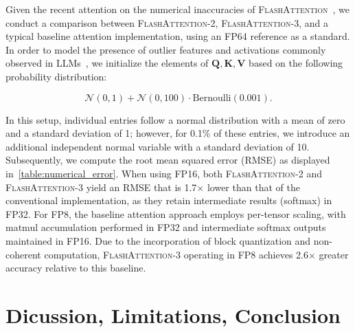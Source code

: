 Given the recent attention on the numerical inaccuracies of \textsc{FlashAttention}~\citep{golden2024flash}, we conduct a comparison between \textsc{FlashAttention-2}, \textsc{FlashAttention-3}, and a typical baseline attention implementation, using an FP64 reference as a standard. In order to model the presence of outlier features and activations commonly observed in LLMs~\citep{dettmers2208llm, sun2024massive}, we initialize the elements of $\mathbf{Q}, \mathbf{K}, \mathbf{V}$ based on the following probability distribution:

\begin{equation*}
  \mathcal{N}(0, 1) + \mathcal{N}(0, 100) \cdot \mathrm{Bernoulli}(0.001).
\end{equation*}

In this setup, individual entries follow a normal distribution with a mean of zero and a standard deviation of 1; however, for 0.1\% of these entries, we introduce an additional independent normal variable with a standard deviation of 10. Subsequently, we compute the root mean squared error (RMSE) as displayed in~\cref{table:numerical_error}. When using FP16, both \textsc{FlashAttention-2} and \textsc{FlashAttention-3} yield an RMSE that is 1.7$\times$ lower than that of the conventional implementation, as they retain intermediate results (softmax) in FP32. For FP8, the baseline attention approach employs per-tensor scaling, with matmul accumulation performed in FP32 and intermediate softmax outputs maintained in FP16. Due to the incorporation of block quantization and non-coherent computation, \textsc{FlashAttention-3} operating in FP8 achieves 2.6$\times$ greater accuracy relative to this baseline.

\section{Dicussion, Limitations, Conclusion}
\label{sec:discussion}

